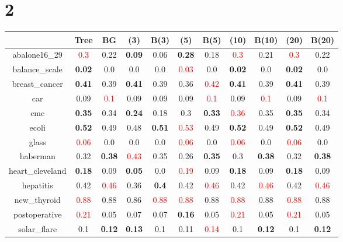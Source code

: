 \documentclass{article}%
\begin{document}
\section*{2}%
\begin{tabular}{c|cccccccccc}%
\hline%
&Tree&BG&(3)&B(3)&(5)&B(5)&(10)&B(10)&(20)&B(20)\\%
\hline%
abalone16\_29&\textcolor{red}{ 
0.3
}&0.22&\textbf{0.09}&0.06&\textbf{0.28}&0.18&\textcolor{red}{ 
0.3
}&0.21&\textcolor{red}{ 
0.3
}&0.22\\%
\hline%
balance\_scale&\textbf{0.02}&0.0&0.0&0.0&\textcolor{red}{ 
0.03
}&0.0&\textbf{0.02}&0.0&\textbf{0.02}&0.0\\%
\hline%
breast\_cancer&\textbf{0.41}&0.39&\textbf{0.41}&0.39&0.36&\textcolor{red}{ 
0.42
}&\textbf{0.41}&0.39&\textbf{0.41}&0.39\\%
\hline%
car&0.09&\textcolor{red}{ 
0.1
}&0.09&0.09&0.09&\textcolor{red}{ 
0.1
}&0.09&\textcolor{red}{ 
0.1
}&0.09&\textcolor{red}{ 
0.1
}\\%
\hline%
cmc&\textbf{0.35}&0.34&\textbf{0.24}&0.18&0.3&\textbf{0.33}&\textcolor{red}{ 
0.36
}&0.35&\textbf{0.35}&0.34\\%
\hline%
ecoli&\textbf{0.52}&0.49&0.48&\textbf{0.51}&\textcolor{red}{ 
0.53
}&0.49&\textbf{0.52}&0.49&\textbf{0.52}&0.49\\%
\hline%
glass&\textcolor{red}{ 
0.06
}&0.0&0.0&0.0&\textcolor{red}{ 
0.06
}&0.0&\textcolor{red}{ 
0.06
}&0.0&\textcolor{red}{ 
0.06
}&0.0\\%
\hline%
haberman&0.32&\textbf{0.38}&\textcolor{red}{ 
0.43
}&0.35&0.26&\textbf{0.35}&0.3&\textbf{0.38}&0.32&\textbf{0.38}\\%
\hline%
heart\_cleveland&\textbf{0.18}&0.09&\textbf{0.05}&0.0&\textcolor{red}{ 
0.19
}&0.09&\textbf{0.18}&0.09&\textbf{0.18}&0.09\\%
\hline%
hepatitis&0.42&\textcolor{red}{ 
0.46
}&0.36&\textbf{0.4}&0.42&\textcolor{red}{ 
0.46
}&0.42&\textcolor{red}{ 
0.46
}&0.42&\textcolor{red}{ 
0.46
}\\%
\hline%
new\_thyroid&\textcolor{red}{ 
0.88
}&0.88&0.86&\textcolor{red}{ 
0.88
}&\textcolor{red}{ 
0.88
}&0.88&\textcolor{red}{ 
0.88
}&0.88&\textcolor{red}{ 
0.88
}&0.88\\%
\hline%
postoperative&\textcolor{red}{ 
0.21
}&0.05&0.07&0.07&\textbf{0.16}&0.05&\textcolor{red}{ 
0.21
}&0.05&\textcolor{red}{ 
0.21
}&0.05\\%
\hline%
solar\_flare&0.1&\textbf{0.12}&\textbf{0.13}&0.1&0.11&\textcolor{red}{ 
0.14
}&0.1&\textbf{0.12}&0.1&\textbf{0.12}\\%

\end{tabular}
\end{document}

